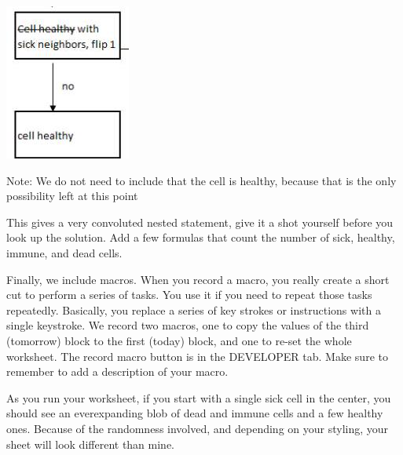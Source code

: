 \documentclass[10pt]{article}
\begin{document}
\includegraphics[max width=\textwidth]{2022_07_05_5945264bba2a5f6ba667g-24(1)}

Note: We do not need to include that the cell is healthy, because that is the only possibility left at this point

This gives a very convoluted nested statement, give it a shot yourself before you look up the solution. Add a few formulas that count the number of sick, healthy, immune, and dead cells.

Finally, we include macros. When you record a macro, you really create a short cut to perform a series of tasks. You use it if you need to repeat those tasks repeatedly. Basically, you replace a series of key strokes or instructions with a single keystroke. We record two macros, one to copy the values of the third (tomorrow) block to the first (today) block, and one to re-set the whole worksheet. The record macro button is in the DEVELOPER tab. Make sure to remember to add a description of your macro.

As you run your worksheet, if you start with a single sick cell in the center, you should see an everexpanding blob of dead and immune cells and a few healthy ones. Because of the randomness involved, and depending on your styling, your sheet will look different than mine.
\end{document}

